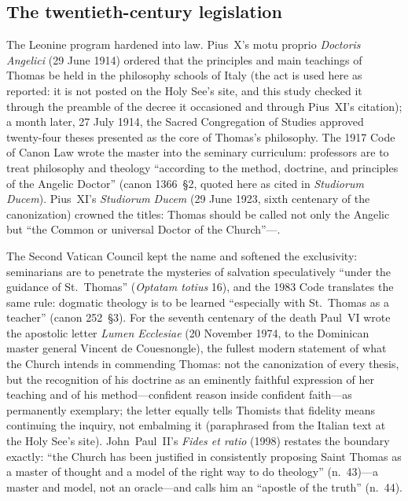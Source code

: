 \subsection{The twentieth-century legislation}

The Leonine program hardened into law. Pius~X's motu proprio
\textit{Doctoris Angelici} (29 June 1914) ordered that the principles
and main teachings of Thomas be held in the philosophy schools of Italy
(the act is used here as reported: it is not posted on the Holy See's
site, and this study checked it through the preamble of the decree it
occasioned and through Pius~XI's citation); a month later, 27 July
1914, the Sacred Congregation of Studies approved twenty-four theses
presented as the core of Thomas's philosophy. The 1917 Code of Canon
Law wrote the master into the seminary curriculum: professors are to
treat philosophy and theology ``according to the method, doctrine, and
principles of the Angelic Doctor'' (canon 1366~\S2, quoted here as
cited in \textit{Studiorum Ducem}). Pius~XI's \textit{Studiorum Ducem}
(29 June 1923, sixth centenary of the canonization) crowned the titles:
Thomas should be called not only the Angelic but ``the Common or
universal Doctor of the Church''---.

The Second Vatican Council kept the name and softened the exclusivity:
seminarians are to penetrate the mysteries of salvation speculatively
``under the guidance of St.~Thomas'' (\textit{Optatam totius} 16), and
the 1983 Code translates the same rule: dogmatic theology is to be
learned ``especially with St.~Thomas as a teacher'' (canon 252~\S3).
For the seventh centenary of the death Paul~VI wrote the apostolic
letter \textit{Lumen Ecclesiae} (20 November 1974, to the Dominican
master general Vincent de Couesnongle), the fullest modern statement of
what the Church intends in commending Thomas: not the canonization of
every thesis, but the recognition of his doctrine as an eminently
faithful expression of her teaching and of his method---confident
reason inside confident faith---as permanently exemplary; the letter
equally tells Thomists that fidelity means continuing the inquiry, not
embalming it (paraphrased from the Italian text at the Holy See's
site). John~Paul~II's \textit{Fides et ratio} (1998) restates the
boundary exactly: ``the Church has been justified in consistently
proposing Saint Thomas as a master of thought and a model of the right
way to do theology'' (n.~43)---a master and model, not an oracle---and
calls him an ``apostle of the truth'' (n.~44).

